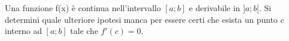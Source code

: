 Una funzione f(x) è continua nell’intervallo $[a; b]$ e derivabile in $]a; b[$. 
Si determini quale ulteriore ipotesi manca per essere
certi che esista un punto $c$ interno ad $[a; b]$ tale che $f'(c)=0$.
